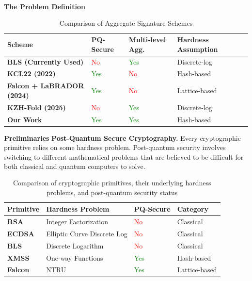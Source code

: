 \documentclass[final]{beamer}
\newlength{\colwidth}
\newcommand{\subtitleformat}[1]{%
  {\fontsize{32pt}{38pt}\selectfont\color{blue!60!black}\textbf{#1}}%
}
\begin{document}
\begin{frame}[t]
\begin{columns}[t]
\begin{column}{\colwidth}
\begin{block}{\fontsize{42}{48}\selectfont\bfseries The Problem Definition}
            \begin{table}[h!]
        \centering
        \begin{tabular}{@{}lllll@{}}
        \toprule
        \textbf{Scheme} & \textbf{PQ-Secure} & \textbf{Multi-level Agg.} & \textbf{Hardness Assumption}  \\ \midrule
        \textbf{BLS (Currently Used)} \cite{ethresearPragmaticSignature} & \textcolor{red}{No} & \textcolor{green}{Yes} & Discrete-log \\
        \textbf{KCL22 (2022)} \cite{Khaburzaniya2022} & \textcolor{green}{Yes} & \textcolor{red}{No} & Hash-based\\
        \textbf{Falcon + LaBRADOR (2024)} \cite{LaBRADOR-Falcon} & \textcolor{green}{Yes} & \textcolor{red}{No} & Lattice-based \\
        \textbf{KZH-Fold (2025)} \cite{KZH-Fold} & \textcolor{red}{No} & \textcolor{green}{Yes} & Discrete-log \\
        \textbf{Our Work} & \textcolor{green}{Yes} & \textcolor{green}{Yes} & Hash-based \\
        \bottomrule
        \end{tabular}
        \caption{Comparison of Aggregate Signature Schemes}
        \end{table}

    \end{block}

    \begin{block}{\fontsize{42}{48}\selectfont\bfseries Preliminaries}
          \subtitleformat{Post-Quantum Secure Cryptography.}  Every cryptographic primitive relies on some hardness problem. Post-quantum security involves switching to different mathematical problems that are believed to be difficult for both classical and quantum computers to solve.

        \begin{table}[h!]
    \centering
    \begin{tabular}{@{}llll@{}}
    \toprule
    \textbf{Primitive} & \textbf{Hardness Problem} & \textbf{PQ-Secure} & \textbf{Category} \\ \midrule
    \textbf{RSA} & Integer Factorization & \textcolor{red}{No} & Classical \\
    \textbf{ECDSA} & Elliptic Curve Discrete Log & \textcolor{red}{No} & Classical \\
    \textbf{BLS} & Discrete Logarithm & \textcolor{red}{No} & Classical \\
    \midrule
    \textbf{XMSS} & One-way Functions & \textcolor{green}{Yes} & Hash-based \\
    \textbf{Falcon} & NTRU & \textcolor{green}{Yes} & Lattice-based \\
    \bottomrule
    \end{tabular}
    \caption{Comparison of cryptographic primitives, their underlying hardness problems, and post-quantum security status}
    \end{table}



\end{block}
\end{column}
\end{columns}
\end{frame}
\end{document}
